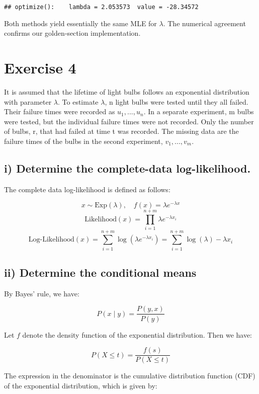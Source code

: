 \documentclass[
]{article}
\begin{document}
\begin{verbatim}
## optimize():    lambda = 2.053573  value = -28.34572
\end{verbatim}

Both methods yield essentially the same MLE for \(\lambda\). The
numerical agreement confirms our golden‐section implementation.

\section{Exercise 4}\label{exercise-4}

It is assumed that the lifetime of light bulbs follows an exponential
distribution with parameter \(\lambda\). To estimate \(\lambda\), n
light bulbs were tested until they all failed. Their failure times were
recorded as \(u_{1}, . . . , u_{n}\). In a separate experiment, m bulbs
were tested, but the individual failure times were not recorded. Only
the number of bulbs, r, that had failed at time t was recorded. The
missing data are the failure times of the bulbs in the second
experiment, \(v_{1}, . . . , v_{m}\).

\subsection{i) Determine the complete-data
log-likelihood.}\label{i-determine-the-complete-data-log-likelihood.}

The complete data log-likelihood is defined as follows:

\[
x \sim \text{Exp}(\lambda), \quad f(x) = \lambda e^{-\lambda x}
\] \[
\text{Likelihood}(x) = \prod_{i=1}^{n+m} \lambda e^{-\lambda x_{i}}
\] \[
\text{Log-Likelihood}(x) = \sum_{i=1}^{n+m} \log(\lambda e^{-\lambda x_{i}}) = \sum_{i=1}^{n+m} \log(\lambda) - \lambda x_{i}
\]

\subsection{ii) Determine the conditional
means}\label{ii-determine-the-conditional-means}

By Bayes' rule, we have:

\[
P(x \mid y) = \frac{P(y, x)}{P(y)}
\]

Let \(f\) denote the density function of the exponential distribution.
Then we have:

\[
P(X \leq t) = \frac{f(s)}{P(X \leq t)}
\]

The expression in the denominator is the cumulative distribution
function (CDF) of the exponential distribution, which is given by:
\end{document}
